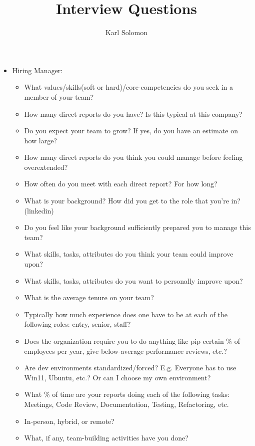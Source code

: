 \documentclass{article}
\begin{document}
\selectfont
\title{Interview Questions}
\author{Karl Solomon}

\maketitle
\small
\begin{itemize}
	\item Hiring Manager:
	      \begin{itemize}
		      \item What values/skills(soft or hard)/core-competencies do you seek in a member of your team?
		      \item How many direct reports do you have? Is this typical at this company?
		      \item Do you expect your team to grow? If yes, do you have an estimate on how large?
		      \item How many direct reports do you think you could manage before feeling overextended?
		      \item How often do you meet with each direct report? For how long?
		      \item What is your background? How did you get to the role that you're in? (linkedin)
			  \item Do you feel like your background sufficiently prepared you to manage this team?
		      \item What skills, tasks, attributes do you think your team could improve upon?
		      \item What skills, tasks, attributes do you want to personally improve upon?
		      \item What is the average tenure on your team?
		      \item Typically how much experience does one have to be at each of the following roles: entry, senior, staff?
		      \item Does the organization require you to do anything like pip certain \% of employees per year, give below-average performance reviews, etc.?
			  \item Are dev environments standardized/forced? E.g. Everyone has to use Win11, Ubuntu, etc.? Or can I choose my own environment?
			  \item What \% of time are your reports doing each of the following tasks: Meetings, Code Review, Documentation, Testing, Refactoring, etc.
			  \item In-person, hybrid, or remote?
		      \item What, if any, team-building activities have you done?

\end{itemize}
\end{itemize}
\end{document}

